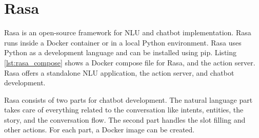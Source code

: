 
\section{Rasa}
Rasa\cite{rasa} is an open-source framework for NLU and chatbot implementation.
Rasa runs inside a Docker container or in a local Python environment.
Rasa uses Python as a development language and can be installed using pip.
Listing \ref{lst:rasa_compose} shows a Docker compose file for Rasa, and the action server. 
Rasa offers a standalone NLU application, the action server, and chatbot development.

Rasa consists of two parts for chatbot development.
The natural language part takes care of everything related to 
the conversation like intents, entities, the story, and the conversation flow.
The second part handles the slot filling and other actions.
For each part, a Docker image can be created.

